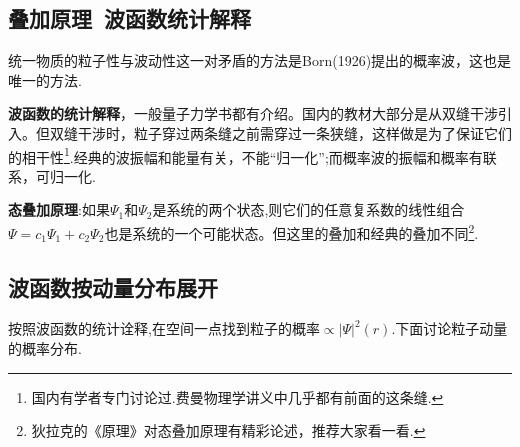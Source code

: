 \documentclass[13pt,a4paper]{article}
\begin{document}
\begin{CJK}{UTF8}{song}
\subsection{叠加原理\ 波函数统计解释}
统一物质的粒子性与波动性这一对矛盾的方法是Born(1926)提出的概率波，这也是唯一的方法.

\textbf{波函数的统计解释}，一般量子力学书都有介绍。国内的教材大部分是从双缝干涉引入。但双缝干涉时，粒子穿过两条缝之前需穿过一条狭缝，这样做是为了保证它们的相干性\footnote{国内有学者专门讨论过.费曼物理学讲义中几乎都有前面的这条缝.}.经典的波振幅和能量有关，不能“归一化”;而概率波的振幅和概率有联系，可归一化.

\textbf{态叠加原理}:如果$\Psi_{1}$和$\Psi_{2}$是系统的两个状态,则它们的任意复系数的线性组合$\Psi= c_1\Psi_{1}+c_2\Psi_{2}$也是系统的一个可能状态。但这里的叠加和经典的叠加不同\footnote{狄拉克的《原理》对态叠加原理有精彩论述，推荐大家看一看.}.






\subsection{波函数按动量分布展开}
按照波函数的统计诠释,在空间一点找到粒子的概率$\propto |\Psi|^2(r)$.下面讨论粒子动量的概率分布.


\end{CJK}
\end{document}
